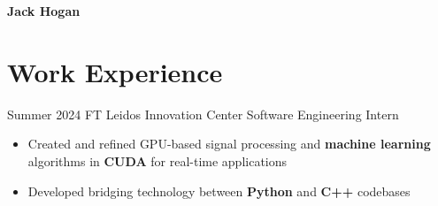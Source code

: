 \documentclass[
	10pt, %
]{FreemanCV}
\begin{document}
\begin{paracol}{2} %



	\parbox[][0.11\textheight][c]{\linewidth}{ %

		{\sffamily\Huge \textbf{Jack Hogan}} %



	}


	\section{Work Experience}





	\jobentry
	{Summer 2024} %
	{FT} %
	{Leidos Innovation Center} %
	{Software Engineering Intern} %
	{\vspace{-7mm}\begin{itemize}
			\item Created and refined GPU-based signal processing and \textbf{machine learning} algorithms in \textbf{CUDA} for real-time applications
			\item Developed bridging technology between \textbf{Python} and \textbf{C++} codebases
		\end{itemize}\vspace{-4mm}} %


\end{paracol}
\end{document}
